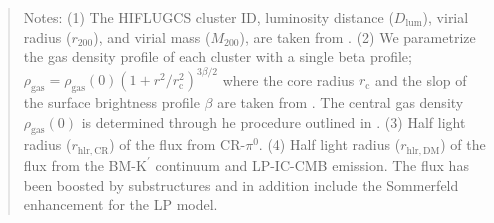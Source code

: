 \documentclass[10pt,aps,pra,reprint,amsmath,amsfonts,amssymb,showpacs,nofootinbib,floatfix]{revtex4-1}
\newcommand{\rmn}{\mathrm}
\newcommand{\Kp}{\rmn{K}^\prime}
\newcommand{\rvir}{r_{200}}
\newcommand{\mvir}{M_{200}}
\begin{document}
\begin{table}
\begin{minipage}{2.0\columnwidth}
\begin{quote}
  Notes: 
  (1) The HIFLUGCS cluster ID, luminosity distance
  ($D_\rmn{lum}$), virial radius ($\rvir$), and virial mass ($\mvir$),
  are taken from \cite{2002ApJ...567..716R}.
  (2) We parametrize the
  gas density profile of each cluster with a single beta profile;
  $\rho_\rmn{gas}=\rho_\rmn{gas}(0)(1+r^2/r_\rmn{c}^2)^{3\beta/2}$
  where the core radius $r_\rmn{c}$ and the slop of the surface
  brightness profile $\beta$ are taken from
  \cite{2002ApJ...567..716R}. The central gas density
  $\rho_\rmn{gas}(0)$ is determined through he procedure outlined in
  \cite{1999ApJ...517..627M}.
  (3) Half light radius ($r_\rmn{hlr,CR}$) of the flux from CR-$\pi^0$.
  (4) Half light radius ($r_\rmn{hlr,DM}$) of the flux from the BM-$\Kp$ 
  continuum and LP-IC-CMB emission. The flux has been
  boosted by substructures and in addition include the
  Sommerfeld enhancement for the LP model. 
 \label{tab:flux_tab_CLp}
  \end{quote}
\end{minipage}
\end{table} 
\end{document}
